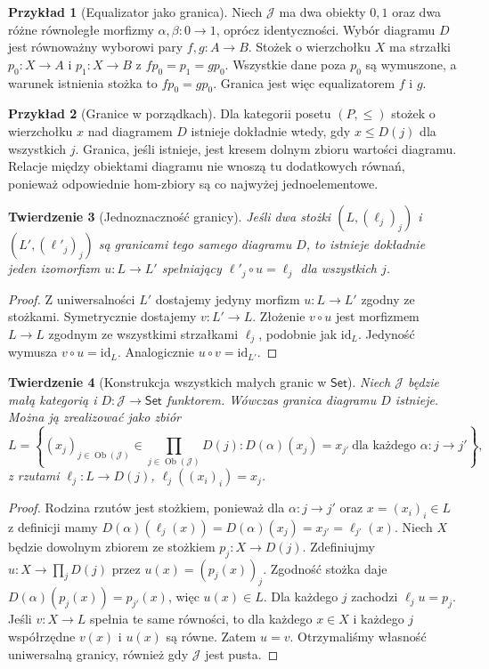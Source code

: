 \documentclass[11pt,a4paper]{article}
\numberwithin{equation}{section}
\theoremstyle{plain}
\newtheorem{twierdzenie}{Twierdzenie}[section]
\theoremstyle{definition}
\newtheorem{przyklad}[twierdzenie]{Przykład}
\theoremstyle{remark}
\newcommand{\cat}[1]{\mathsf{#1}}
\newcommand{\Set}{\cat{Set}}
\newcommand{\id}{\mathrm{id}}
\newcommand{\Ob}{\operatorname{Ob}}
\begin{document}
\begin{przyklad}[Equalizator jako granica]
Niech $\mathcal J$ ma dwa obiekty $0,1$ oraz dwa różne równoległe morfizmy $\alpha,\beta:0\to1$, oprócz identyczności. Wybór diagramu $D$ jest równoważny wyborowi pary $f,g:A\to B$. Stożek o wierzchołku $X$ ma strzałki $p_0:X\to A$ i $p_1:X\to B$ z $fp_0=p_1=gp_0$. Wszystkie dane poza $p_0$ są wymuszone, a warunek istnienia stożka to $fp_0=gp_0$. Granica jest więc equalizatorem $f$ i $g$.
\end{przyklad}

\begin{przyklad}[Granice w porządkach]
Dla kategorii posetu $(P,\leq)$ stożek o wierzchołku $x$ nad diagramem $D$ istnieje dokładnie wtedy, gdy $x\leq D(j)$ dla wszystkich $j$. Granica, jeśli istnieje, jest kresem dolnym zbioru wartości diagramu. Relacje między obiektami diagramu nie wnoszą tu dodatkowych równań, ponieważ odpowiednie hom-zbiory są co najwyżej jednoelementowe.
\end{przyklad}

\begin{twierdzenie}[Jednoznaczność granicy]\label{tw:limit-unique}
Jeśli dwa stożki $(L,(\ell_j)_j)$ i $(L',(\ell'_j)_j)$ są granicami tego samego diagramu $D$, to istnieje dokładnie jeden izomorfizm $u:L\to L'$ spełniający $\ell'_j\circ u=\ell_j$ dla wszystkich $j$.
\end{twierdzenie}
\begin{proof}
Z uniwersalności $L'$ dostajemy jedyny morfizm $u:L\to L'$ zgodny ze stożkami. Symetrycznie dostajemy $v:L'\to L$. Złożenie $v\circ u$ jest morfizmem $L\to L$ zgodnym ze wszystkimi strzałkami $\ell_j$, podobnie jak $\id_L$. Jedyność wymusza $v\circ u=\id_L$. Analogicznie $u\circ v=\id_{L'}$.
\end{proof}


\begin{twierdzenie}[Konstrukcja wszystkich małych granic w $\Set$]\label{tw:limits-set}
Niech $\mathcal J$ będzie małą kategorią i $D:\mathcal J\to\Set$ funktorem. Wówczas granica diagramu $D$ istnieje. Można ją zrealizować jako zbiór
\[
L=\left\{(x_j)_{j\in\Ob(\mathcal J)}\in\prod_{j\in\Ob(\mathcal J)}D(j):
D(\alpha)(x_j)=x_{j'}\ \text{dla każdego }\alpha:j\to j'\right\},
\]
z rzutami $\ell_j:L\to D(j)$, $\ell_j((x_i)_i)=x_j$.
\end{twierdzenie}
\begin{proof}
Rodzina rzutów jest stożkiem, ponieważ dla $\alpha:j\to j'$ oraz $x=(x_i)_i\in L$ z definicji mamy $D(\alpha)(\ell_j(x))=D(\alpha)(x_j)=x_{j'}=\ell_{j'}(x)$. Niech $X$ będzie dowolnym zbiorem ze stożkiem $p_j:X\to D(j)$. Zdefiniujmy $u:X\to\prod_jD(j)$ przez $u(x)=(p_j(x))_j$. Zgodność stożka daje $D(\alpha)(p_j(x))=p_{j'}(x)$, więc $u(x)\in L$. Dla każdego $j$ zachodzi $\ell_ju=p_j$. Jeśli $v:X\to L$ spełnia te same równości, to dla każdego $x\in X$ i każdego $j$ współrzędne $v(x)$ i $u(x)$ są równe. Zatem $u=v$. Otrzymaliśmy własność uniwersalną granicy, również gdy $\mathcal J$ jest pusta.
\end{proof}
\end{document}
